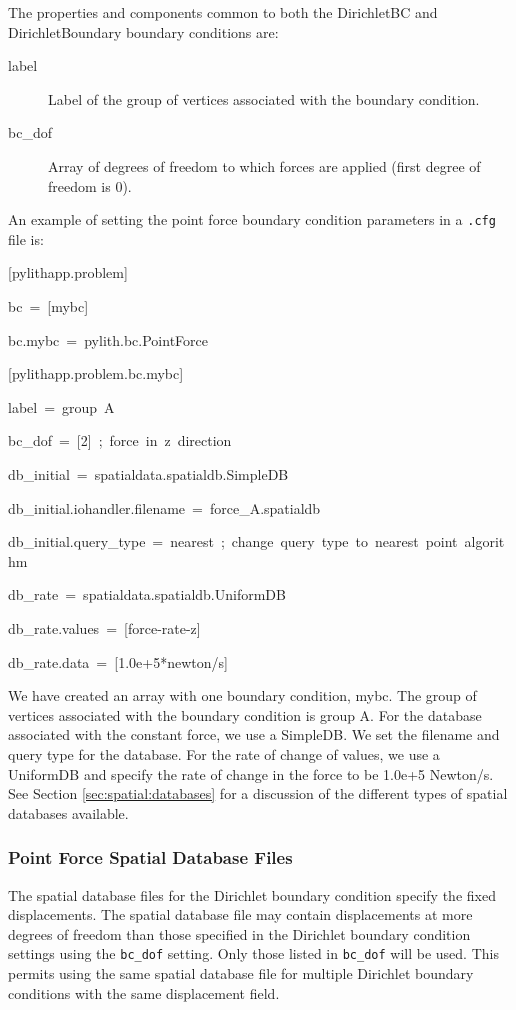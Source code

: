 The properties and components common to both the DirichletBC and DirichletBoundary
boundary conditions are:
\begin{description}
\item [{label}] Label of the group of vertices associated with the boundary
condition.
\item [{bc\_dof}] Array of degrees of freedom to which forces are applied
(first degree of freedom is 0).
\end{description}
An example of setting the point force boundary condition parameters
in a \texttt{.cfg} file is:
\begin{lyxcode}
{[}pylithapp.problem{]}

bc~=~{[}mybc{]}

bc.mybc~=~pylith.bc.PointForce



{[}pylithapp.problem.bc.mybc{]}

label~=~group~A~

bc\_dof~=~{[}2{]}~;~force~in~z~direction

db\_initial~=~spatialdata.spatialdb.SimpleDB

db\_initial.iohandler.filename~=~force\_A.spatialdb

db\_initial.query\_type~=~nearest~;~change~query~type~to~nearest~point~algorithm

db\_rate~=~spatialdata.spatialdb.UniformDB

db\_rate.values~=~{[}force-rate-z{]}

db\_rate.data~=~{[}1.0e+5{*}newton/s{]}
\end{lyxcode}
We have created an array with one boundary condition, mybc. The group
of vertices associated with the boundary condition is group A. For
the database associated with the constant force, we use a SimpleDB.
We set the filename and query type for the database. For the rate
of change of values, we use a UniformDB and specify the rate of change
in the force to be 1.0e+5 Newton/s. See Section \ref{sec:spatial:databases}
for a discussion of the different types of spatial databases available.


\subsubsection{Point Force Spatial Database Files}

The spatial database files for the Dirichlet boundary condition specify
the fixed displacements. The spatial database file may contain displacements
at more degrees of freedom than those specified in the Dirichlet boundary
condition settings using the \texttt{bc\_dof} setting. Only those
listed in \texttt{bc\_dof} will be used. This permits using the same
spatial database file for multiple Dirichlet boundary conditions with
the same displacement field.

